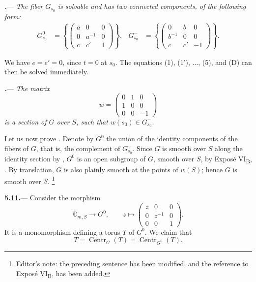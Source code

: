 \par\medskip\noindent
\textbf{\textit{.}}---
\textit{The fiber \(G_{s_0}\) is solvable and has two connected
components, of the following form:}
\[
\begin{aligned}
  G^0_{s_0}
  &=
  \left\{
  \begin{pmatrix}
    a&0&0\\
    0&a^{-1}&0\\
    c&c'&1
  \end{pmatrix}
  \right\},
  &
  G^-_{s_0}
  &=
  \left\{
  \begin{pmatrix}
    0&b&0\\
    b^{-1}&0&0\\
    c&c'&-1
  \end{pmatrix}
  \right\}.
\end{aligned}
\]

We have \(e=e'=0\), since \(t=0\) at \(s_0\).  The equations
\textup{(1)}, \textup{(1')}, \(\ldots\), \textup{(5)}, and
\textup{(D)} can then be solved immediately.

\par\medskip\noindent
{}\textbf{\textit{.}}---
\textit{The matrix}
\[
  w=
  \begin{pmatrix}
    0&1&0\\
    1&0&0\\
    0&0&-1
  \end{pmatrix}
\]
\textit{is a section of \(G\) over \(S\), such that
\(w(s_0)\in G^-_{s_0}\).}

Let us now prove .  Denote by \(G^0\) the union of the
identity components of the fibers of \(G\), that is, the complement
of \(G^-_{s_0}\).  Since \(G\) is smooth over \(S\) along the identity
section by , \(G^0\) is an open subgroup of \(G\), smooth
over \(S\), by Exposé VI\textsubscript{B}, .  By translation,
\(G\) is also plainly smooth at the points of \(w(S)\); hence \(G\)
is smooth over \(S\).
\footnote{Editor's note: the preceding sentence has been modified,
and the reference to Exposé VI\textsubscript{B},  has been
added.}

\par\medskip\noindent
\textbf{5.11.}---
Consider the morphism
\[
  \mathbb G_{m,S}\longrightarrow G^0,
  \qquad
  z\longmapsto
  \begin{pmatrix}
    z&0&0\\
    0&z^{-1}&0\\
    0&0&1
  \end{pmatrix}.
\]
It is a monomorphism defining a torus \(T\) of \(G^0\).  We claim
that
\[
  T=\operatorname{Centr}_G(T)
   =\operatorname{Centr}_{G^0}(T).
\]

